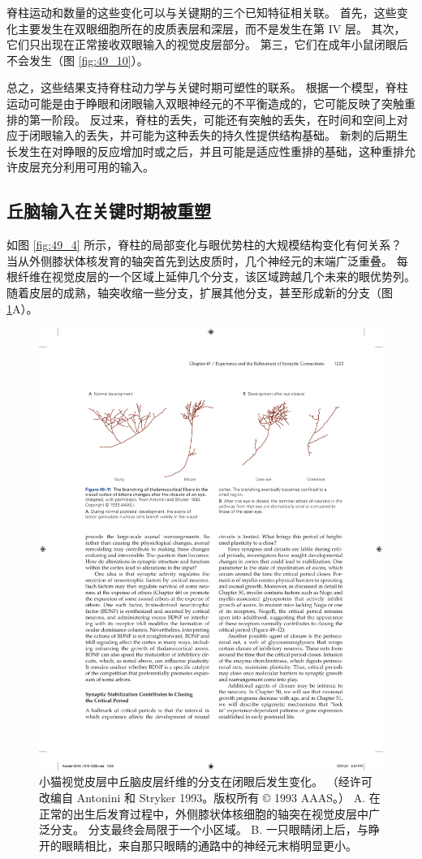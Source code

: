 脊柱运动和数量的这些变化可以与关键期的三个已知特征相关联。 首先，这些变化主要发生在双眼细胞所在的皮质表层和深层，而不是发生在第 IV 层。 其次，它们只出现在正常接收双眼输入的视觉皮层部分。 第三，它们在成年小鼠闭眼后不会发生（图 \ref{fig:49_10}）。

总之，这些结果支持脊柱动力学与关键时期可塑性的联系。 根据一个模型，脊柱运动可能是由于睁眼和闭眼输入双眼神经元的不平衡造成的，它可能反映了突触重排的第一阶段。 反过来，脊柱的丢失，可能还有突触的丢失，在时间和空间上对应于闭眼输入的丢失，并可能为这种丢失的持久性提供结构基础。 新刺的后期生长发生在对睁眼的反应增加时或之后，并且可能是适应性重排的基础，这种重排允许皮层充分利用可用的输入。

\subsection{丘脑输入在关键时期被重塑}
如图 \ref{fig:49_4} 所示，脊柱的局部变化与眼优势柱的大规模结构变化有何关系？ 当从外侧膝状体核发育的轴突首先到达皮质时，几个神经元的末端广泛重叠。 每根纤维在视觉皮层的一个区域上延伸几个分支，该区域跨越几个未来的眼优势列。 
随着皮层的成熟，轴突收缩一些分支，扩展其他分支，甚至形成新的分支（图 \ref{fig:49_11}A）。

\begin{figure}[htbp]
	\centering
	\includegraphics[width=0.95\linewidth]{chap49/fig_49_11}
	\caption{小猫视觉皮层中丘脑皮层纤维的分支在闭眼后发生变化。 （经许可改编自 Antonini 和 Stryker 1993。版权所有 © 1993 AAAS。） A. 在正常的出生后发育过程中，外侧膝状体核细胞的轴突在视觉皮层中广泛分支。 分支最终会局限于一个小区域。 B. 一只眼睛闭上后，与睁开的眼睛相比，来自那只眼睛的通路中的神经元末梢明显更小。}
	\label{fig:49_11}
\end{figure}

